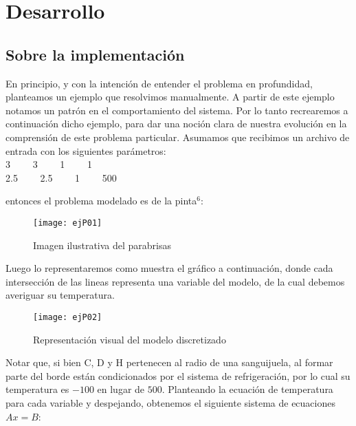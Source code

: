 \section{Desarrollo}

\subsection{Sobre la implementación}

En principio, y con la intención de entender el problema en profundidad, planteamos un ejemplo que resolvimos manualmente. A partir de este ejemplo notamos un patrón en el comportamiento del sistema. Por lo tanto recrearemos a continuación dicho ejemplo, para dar una noción clara de nuestra evolución en la comprensión de este problema particular. Asumamos que recibimos un archivo de entrada con los siguientes parámetros:\\

3 \ \ \ \   3  \ \ \ \ 1 \ \ \ \ 1\\
2.5  \ \ \ \ 2.5 \ \ \ \ 1  \ \ \ \ 500

entonces el problema modelado es de la pinta$^6$:

\begin{figure}[t]
    \centering
    \texttt{[image: ejP01]}
    \caption{Imagen ilustrativa del parabrisas}
\end{figure}

Luego lo representaremos como muestra el gráfico a continuación, donde cada intersección de las lineas representa una variable del modelo, de la cual debemos averiguar su temperatura.

\begin{figure}[t]
    \centering
    \texttt{[image: ejP02]}
    \caption{Representación visual del modelo discretizado}
\end{figure}

Notar que, si bien C, D y H pertenecen al radio de una sanguijuela, al formar parte del borde están condicionados por el sistema de refrigeración, por lo cual su temperatura es $-100$ en lugar de $500$. Planteando la ecuación de temperatura para cada variable y despejando, obtenemos el siguiente sistema de ecuaciones $Ax=B$:

